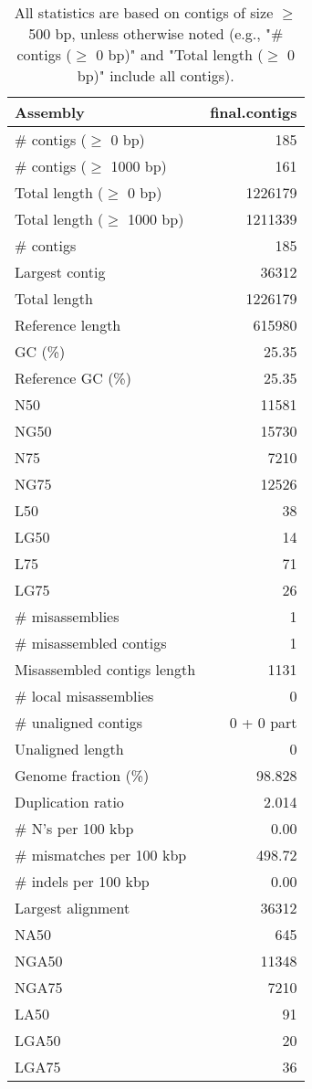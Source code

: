 \documentclass[12pt,a4paper]{article}
\begin{document}
\begin{table}[ht]
\begin{center}
\caption{All statistics are based on contigs of size $\geq$ 500 bp, unless otherwise noted (e.g., "\# contigs ($\geq$ 0 bp)" and "Total length ($\geq$ 0 bp)" include all contigs).}
\begin{tabular}{|l*{1}{|r}|}
\hline
Assembly & final.contigs \\ \hline
\# contigs ($\geq$ 0 bp) & 185 \\ \hline
\# contigs ($\geq$ 1000 bp) & 161 \\ \hline
Total length ($\geq$ 0 bp) & 1226179 \\ \hline
Total length ($\geq$ 1000 bp) & 1211339 \\ \hline
\# contigs & 185 \\ \hline
Largest contig & 36312 \\ \hline
Total length & 1226179 \\ \hline
Reference length & 615980 \\ \hline
GC (\%) & 25.35 \\ \hline
Reference GC (\%) & 25.35 \\ \hline
N50 & 11581 \\ \hline
NG50 & 15730 \\ \hline
N75 & 7210 \\ \hline
NG75 & 12526 \\ \hline
L50 & 38 \\ \hline
LG50 & 14 \\ \hline
L75 & 71 \\ \hline
LG75 & 26 \\ \hline
\# misassemblies & 1 \\ \hline
\# misassembled contigs & 1 \\ \hline
Misassembled contigs length & 1131 \\ \hline
\# local misassemblies & 0 \\ \hline
\# unaligned contigs & 0 + 0 part \\ \hline
Unaligned length & 0 \\ \hline
Genome fraction (\%) & 98.828 \\ \hline
Duplication ratio & 2.014 \\ \hline
\# N's per 100 kbp & 0.00 \\ \hline
\# mismatches per 100 kbp & 498.72 \\ \hline
\# indels per 100 kbp & 0.00 \\ \hline
Largest alignment & 36312 \\ \hline
NA50 & 645 \\ \hline
NGA50 & 11348 \\ \hline
NGA75 & 7210 \\ \hline
LA50 & 91 \\ \hline
LGA50 & 20 \\ \hline
LGA75 & 36 \\ \hline
\end{tabular}
\end{center}
\end{table}
\end{document}
